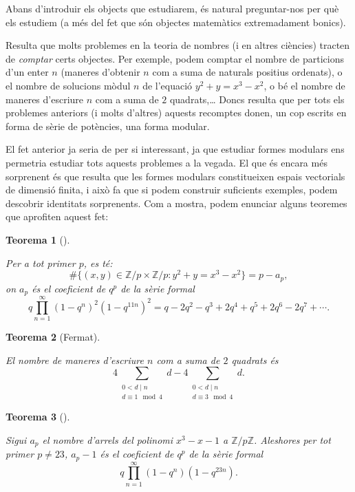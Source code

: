 \documentclass[
  letterpaper,
  DIV=11,
  numbers=noendperiod]{scrreprt}
\theoremstyle{plain}
\newtheorem{theorem}{Teorema}[chapter]
\theoremstyle{plain}
\theoremstyle{definition}
\theoremstyle{plain}
\theoremstyle{plain}
\theoremstyle{definition}
\theoremstyle{remark}
\begin{document}
\providecommand{\slz}{\operatorname{SL}_2(\bZ)}
\providecommand{\to}{\longrightarrow}
\providecommand{\dlog}{\operatorname{dlog}}

\providecommand{\slsh}[1]{|_{#1}}

Abans d'introduir els objects que estudiarem, és natural preguntar-nos
per què els estudiem (a més del fet que són objectes matemàtics
extremadament bonics).

Resulta que molts problemes en la teoria de nombres (i en altres
ciències) tracten de \emph{comptar} certs objectes. Per exemple, podem
comptar el nombre de particions d'un enter \(n\) (maneres d'obtenir
\(n\) com a suma de naturals positius ordenats), o el nombre de
solucions mòdul \(n\) de l'equació \(y^2+y=x^3-x^2\), o bé el nombre de
maneres d'escriure \(n\) com a suma de \(2\) quadrats,\ldots{} Doncs
resulta que per tots els problemes anteriors (i molts d'altres) aquests
recomptes donen, un cop escrits en forma de sèrie de potències, una
forma modular.

El fet anterior ja seria de per si interessant, ja que estudiar formes
modulars ens permetria estudiar tots aquests problemes a la vegada. El
que és encara més sorprenent és que resulta que les formes modulars
constitueixen espais vectorials de dimensió finita, i això fa que si
podem construir suficients exemples, podem descobrir identitats
sorprenents. Com a mostra, podem enunciar alguns teoremes que aprofiten
aquest fet:

\begin{theorem}[]\protect\hypertarget{thm-1}{}\label{thm-1}

Per a tot primer \(p\), es té: \[
\#\{(x,y)\in\mathbb{Z}/p\times\mathbb{Z}/p : y^2+y=x^3-x^2\} = p - a_p,
\] on \(a_p\) és el coeficient de \(q^p\) de la sèrie formal \[
q\prod_{n=1}^\infty (1-q^n)^2(1-q^{11n})^2=q-2q^2-q^3+2q^4+q^5+2q^6-2q^7+\cdots.
\]

\end{theorem}

\begin{theorem}[Fermat]\protect\hypertarget{thm-fermat}{}\label{thm-fermat}

El nombre de maneres d'escriure \(n\) com a suma de \(2\) quadrats és \[
4\sum_{\substack{0<d\mid n\\d \equiv 1\mod 4}} d - 4\sum_{\substack{0<d\mid n\\d \equiv 3\mod 4}} d.
\]

\end{theorem}

\begin{theorem}[]\protect\hypertarget{thm-cubic}{}\label{thm-cubic}

Sigui \(a_p\) el nombre d'arrels del polinomi \(x^3-x-1\) a
\(\mathbb{Z}/p\mathbb{Z}\). Aleshores per tot primer \(p\neq 23\),
\(a_p-1\) és el coeficient de \(q^p\) de la sèrie formal \[
q\prod_{n=1}^\infty (1-q^n)(1-q^{23n}).
\]

\end{theorem}
\end{document}
